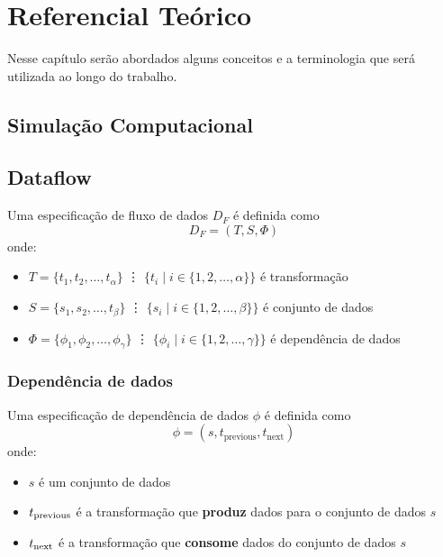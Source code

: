 
\chapter{Referencial Teórico}%
\label{chap:referencial-teorico}


Nesse capítulo serão abordados alguns conceitos e a terminologia que será utilizada ao longo do trabalho.

\section{Simulação Computacional}

\section{Dataflow}%
\label{sec:dataflow}

Uma especificação de fluxo de dados \( D_F \) é definida como \[ D_F = (T, S, \Phi) \] onde:
\begin{itemize}
    \item \( T = \{t_1, t_2, \ldots, t_{\alpha}\} \) \vdots{}
    \( \{t_i \mid i \in \{{1, 2, \ldots, \alpha}\} \} \)
    é transformação
    \item \( S = \{s_1, s_2, \ldots, t_{\beta}\} \) \vdots{}
    \( \{s_i \mid i \in \{{1, 2, \ldots, \beta}\} \} \)
    é conjunto de dados
    \item \( \Phi = \{\phi_1, \phi_2, \ldots, \phi_{\gamma}\} \) \vdots{}
    \( \{\phi_i \mid i \in \{{1, 2, \ldots, \gamma}\} \} \){}
    é dependência de dados
\end{itemize}



\subsection{Dependência de dados}

Uma especificação de dependência de dados \( \phi \) é definida como \[ \phi = (s, t_{\textrm{previous}}, t_{\textrm{next}}) \] onde:
\begin{itemize}
    \item \( s \) é um conjunto de dados
    \item \( t_{\textup{previous}} \) é a transformação que {\bf produz} dados para o conjunto de dados \( s \)
    \item \( t_{\textup{next}} \) é a transformação que {\bf consome} dados do conjunto de dados \( s \)
\end{itemize}

